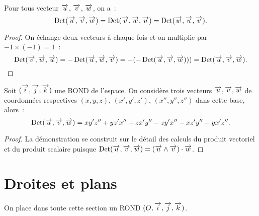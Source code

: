 \begin{cor}
  Pour tous vecteur $\vu$, $\vv$, $\vw$, on a~:
  \begin{equation}
    \Det(\vu,\vv,\vw)=\Det(\vv,\vw,\vu)=\Det(\vw,\vu,\vv).
  \end{equation}
\end{cor}
\begin{proof}
  On échange deux vecteurs à chaque fois et on multiplie par $-1\times(-1)=1$~:
  \begin{equation}
   \Det(\vv,\vw,\vu)=-\Det(\vu,\vw,\vv) =-(-\Det(\vu,\vv,\vw)))=\Det(\vu,\vv,\vw).
  \end{equation}
\end{proof}
\begin{prop}
  Soit $\bondtrois$ une BOND de l'espace. On considère trois vecteurs $\vu,\vv,\vw$ de coordonnées respectives $(x,y,z)$, $(x',y',z')$, $(x'',y'',z'')$ dans cette base, alors~:
  \begin{equation}
    \Det(\vu,\vv,\vw)=xy'z''+yz'x''+zx'y''-zy'x''-xz'y''-yx'z''.
  \end{equation}
\end{prop}
\begin{proof}
  La démonstration se construit sur le détail des calculs du produit vectoriel et du produit scalaire puisque $\Det(\vu,\vv,\vw)=(\vu\wedge\vv)\cdot\vw$.
\end{proof}

\section{Droites et plans}
On place dans toute cette section un ROND $\rondtrois$.

